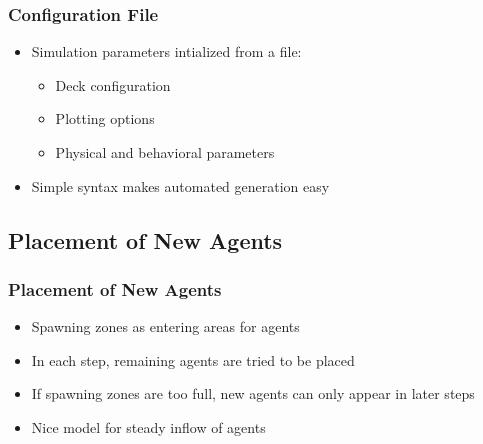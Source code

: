 \documentclass{beamer}
\begin{document}
\begin{frame}
	\frametitle{Configuration File}
	\begin{itemize}
		\item Simulation parameters intialized from a file:
			\begin{itemize}
				\item Deck configuration
				\item Plotting options
				\item Physical and behavioral parameters
			\end{itemize}
		\item Simple syntax makes automated generation easy
	\end{itemize}
\end{frame}

\subsection{Placement of New Agents}
\begin{frame}
	\frametitle{Placement of New Agents}
	\begin{itemize}
		\item Spawning zones as entering areas for agents
		\item In each step, remaining agents are tried to be placed
		\item If spawning zones are too full, new agents can only appear in later steps
		\item Nice model for steady inflow of agents
	\end{itemize}
\end{frame}

\end{document}
